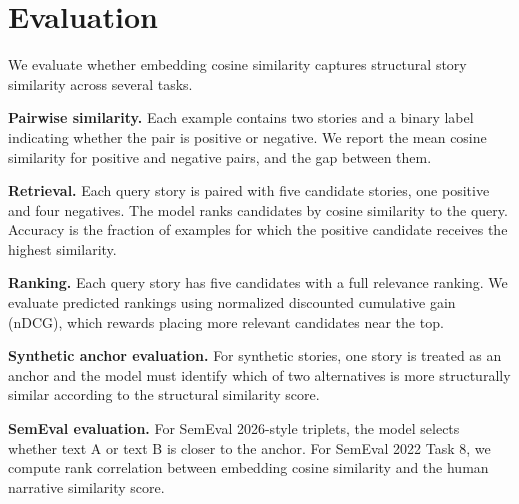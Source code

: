 \section{Evaluation}

We evaluate whether embedding cosine similarity captures structural story similarity across several tasks.

\textbf{Pairwise similarity.}
Each example contains two stories and a binary label indicating whether the pair is positive or negative. We report the mean cosine similarity for positive and negative pairs, and the gap between them.

\textbf{Retrieval.}
Each query story is paired with five candidate stories, one positive and four negatives. The model ranks candidates by cosine similarity to the query. Accuracy is the fraction of examples for which the positive candidate receives the highest similarity.

\textbf{Ranking.}
Each query story has five candidates with a full relevance ranking. We evaluate predicted rankings using normalized discounted cumulative gain (nDCG), which rewards placing more relevant candidates near the top.

\textbf{Synthetic anchor evaluation.}
For synthetic stories, one story is treated as an anchor and the model must identify which of two alternatives is more structurally similar according to the structural similarity score.

\textbf{SemEval evaluation.}
For SemEval 2026-style triplets, the model selects whether text A or text B is closer to the anchor. For SemEval 2022 Task 8, we compute rank correlation between embedding cosine similarity and the human narrative similarity score.
